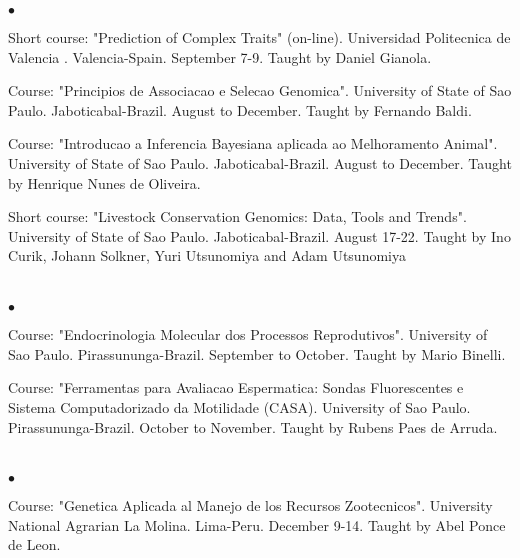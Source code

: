 \documentclass[margin,line,10pt]{res}
\newenvironment{list2}{
  \begin{list}{$\bullet$}{%
      \setlength{\itemsep}{0in}
      \setlength{\parsep}{0in} \setlength{\parskip}{0in}
      \setlength{\topsep}{0in} \setlength{\partopsep}{0in} 
      \setlength{\leftmargin}{0.2in}}}{\end{list}}
\begin{document}
\begin{resume}
\begin{list2}
\item Short course: "Prediction of Complex Traits" (on-line). Universidad Politecnica de Valencia . Valencia-Spain. September 7-9. Taught by Daniel Gianola.
\vspace{0.5cm}
\item Course: "Principios de Associacao e Selecao Genomica". University of State of Sao Paulo. Jaboticabal-Brazil. August to December. Taught by Fernando Baldi.
\vspace{0.5cm}
\item Course: "Introducao a Inferencia Bayesiana aplicada ao Melhoramento Animal". University of State of Sao Paulo. Jaboticabal-Brazil. August to December. Taught by Henrique Nunes de Oliveira.
\vspace{0.5cm}
\item Short course: "Livestock Conservation Genomics: Data, Tools and Trends". University of State of Sao Paulo. Jaboticabal-Brazil. August 17-22. Taught by Ino Curik, Johann Solkner, Yuri Utsunomiya and Adam Utsunomiya
\vspace{0.5cm}
\end{list2}  
\vspace{0.5cm}

\section{}

\begin{list2}
\item Course: "Endocrinologia Molecular dos Processos Reprodutivos". University of Sao Paulo. Pirassununga-Brazil. September to October.
Taught by Mario Binelli.
\vspace{0.5cm}
\item Course: "Ferramentas para Avaliacao Espermatica: Sondas Fluorescentes e Sistema Computadorizado da Motilidade (CASA). University of Sao Paulo. Pirassununga-Brazil. October to November.
Taught by Rubens Paes de Arruda.
\end{list2}  
\vspace{0.5cm}

\section{}

\begin{list2}
\item Course: "Genetica Aplicada al Manejo de los Recursos Zootecnicos". University National Agrarian La Molina. Lima-Peru. December 9-14.
Taught by Abel Ponce de Leon.
\end{list2}  
\vspace{0.5cm}


\end{resume}
\end{document}
